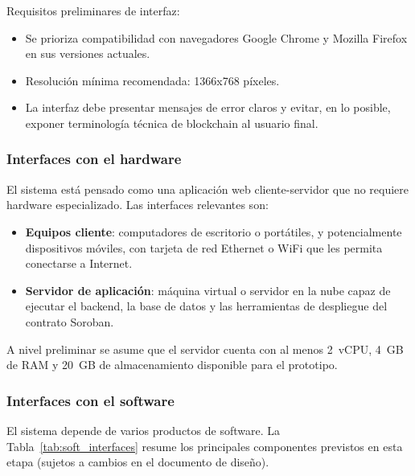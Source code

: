 \documentclass[12pt,letterpaper]{article}
\begin{document}
Requisitos preliminares de interfaz:

\begin{itemize}
    \item Se prioriza compatibilidad con navegadores Google Chrome y Mozilla
          Firefox en sus versiones actuales.
    \item Resolución mínima recomendada: 1366x768 píxeles.
    \item La interfaz debe presentar mensajes de error claros y evitar, en lo
          posible, exponer terminología técnica de blockchain al usuario final.
\end{itemize}

\subsubsection{Interfaces con el hardware}

El sistema está pensado como una aplicación web cliente-servidor que no
requiere hardware especializado. Las interfaces relevantes son:

\begin{itemize}
    \item \textbf{Equipos cliente}: computadores de escritorio o portátiles,
          y potencialmente dispositivos móviles, con tarjeta de red Ethernet o
          WiFi que les permita conectarse a Internet.
    \item \textbf{Servidor de aplicación}: máquina virtual o servidor en la
          nube capaz de ejecutar el backend, la base de datos y las
          herramientas de despliegue del contrato Soroban.
\end{itemize}

A nivel preliminar se asume que el servidor cuenta con al menos 2~vCPU, 4~GB
de RAM y 20~GB de almacenamiento disponible para el prototipo.

\subsubsection{Interfaces con el software}

El sistema depende de varios productos de software. La Tabla~\ref{tab:soft_interfaces}
resume los principales componentes previstos en esta etapa (sujetos a cambios en el
documento de diseño).
\end{document}
